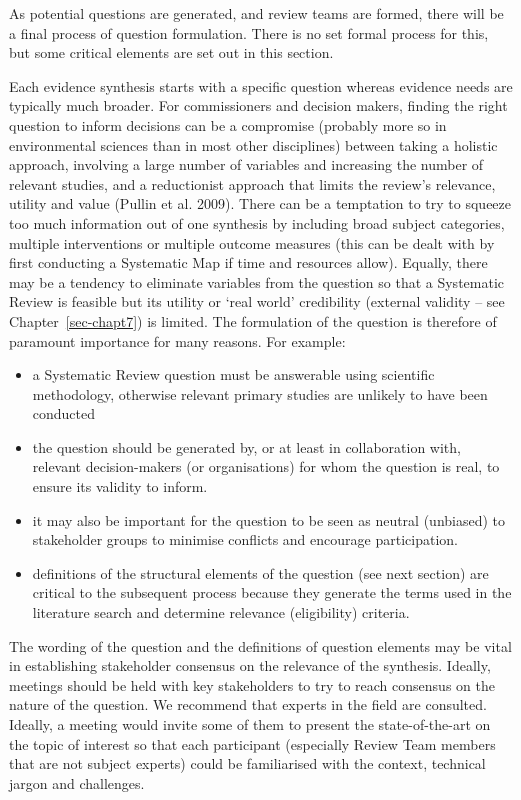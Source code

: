 \documentclass[
  letterpaper,
  DIV=11,
  numbers=noendperiod]{scrreprt}
\begin{document}
As potential questions are generated, and review teams are formed, there
will be a final process of question formulation. There is no set formal
process for this, but some critical elements are set out in this
section.

Each evidence synthesis starts with a specific question whereas evidence
needs are typically much broader. For commissioners and decision makers,
finding the right question to inform decisions can be a compromise
(probably more so in environmental sciences than in most other
disciplines) between taking a holistic approach, involving a large
number of variables and increasing the number of relevant studies, and a
reductionist approach that limits the review's relevance, utility and
value (Pullin et al. 2009). There can be a temptation to try to squeeze
too much information out of one synthesis by including broad subject
categories, multiple interventions or multiple outcome measures (this
can be dealt with by first conducting a Systematic Map if time and
resources allow). Equally, there may be a tendency to eliminate
variables from the question so that a Systematic Review is feasible but
its utility or `real world' credibility (external validity -- see
Chapter~\ref{sec-chapt7}) is limited. The formulation of the question is
therefore of paramount importance for many reasons. For example:

\begin{itemize}
\item
  a Systematic Review question must be answerable using scientific
  methodology, otherwise relevant primary studies are unlikely to have
  been conducted
\item
  the question should be generated by, or at least in collaboration
  with, relevant decision-makers (or organisations) for whom the
  question is real, to ensure its validity to inform.
\item
  it may also be important for the question to be seen as neutral
  (unbiased) to stakeholder groups to minimise conflicts and encourage
  participation.
\item
  definitions of the structural elements of the question (see next
  section) are critical to the subsequent process because they generate
  the terms used in the literature search and determine relevance
  (eligibility) criteria.
\end{itemize}

The wording of the question and the definitions of question elements may
be vital in establishing stakeholder consensus on the relevance of the
synthesis. Ideally, meetings should be held with key stakeholders to try
to reach consensus on the nature of the question. We recommend that
experts in the field are consulted. Ideally, a meeting would invite some
of them to present the state-of-the-art on the topic of interest so that
each participant (especially Review Team members that are not subject
experts) could be familiarised with the context, technical jargon and
challenges.
\end{document}
